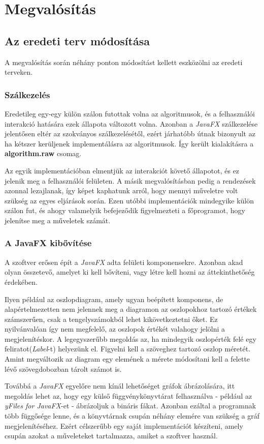 \documentclass{elteikthesis}
\begin{document}
\section{Megvalósítás}
\subsection{Az eredeti terv módosítása}
A megvalósítás során néhány ponton módosítást kellett eszközölni az eredeti terveken.
\subsubsection{Szálkezelés}
Eredetileg egy-egy külön szálon futottak volna az algoritmusok, és a felhasználói interakció hatására ezek állapota változott volna. Azonban a \emph{JavaFX} szálkezelése jelentősen eltér az szokványos szálkezelésétől, ezért járhatóbb útnak bizonyult az ha kétszer kerüljenek implementálásra az algoritmusok. Így került kialakításra a \textbf{algorithm.raw} csomag.\par
 Az egyik implementációban elmentjük az interakciót követő állapotot, és ez jelenik meg a felhasználói felületen. A másik megvalósításban pedig a rendezések azonnal lezajlanak, így képet kaphatunk arról, hogy mennyi műveletre volt szükség az egyes eljárások során. Ezen utóbbi implementációk mindegyike külön szálon fut, és ahogy valamelyik befejeződik figyelmezteti a főprogramot, hogy jelenítse meg a műveletek számát.
\subsubsection{A JavaFX kibővítése}
A szoftver erősen épít a \emph{JavaFX} adta felületi komponensekre. Azonban akad olyan összetevő, amelyet ki kell bővíteni, vagy létre kell hozni az áttekinthetőség érdekében.\par
Ilyen például az oszlopdiagram, amely ugyan beépített komponens, de alapértelmezetten nem jelennek meg a diagramon az oszlopokhoz tartozó értékek számszerűen, csak a tengelyszámokból lehet kikövetkeztetni őket. Ez nyilvánvalóan így nem megfelelő, az oszlopok értékét valahogy jelölni a megjelenítéskor. A legegyszerűbb megoldás az, ha mindegyik oszlopérték felé egy feliratot(\emph{Label}-t) helyezünk el. Figyelni kell a szöveghez tartozó oszlop méretét. Amint megváltozik az diagram egy elemének a mérete módosítani kell a felette lévő szövegdobozban tárolt számot is.\par
Továbbá a \emph{JavaFX} egyelőre nem kínál lehetőséget gráfok ábrázolására, itt megoldás lehet az, hogy egy külső függvénykönyvtárat felhasználva - például az \emph{yFiles for JavaFX}-et -  ábrázoljuk a bináris fákat. Azonban ezáltal a programnak több függősége lenne, és a könyvtárnak csupán néhány elemére van szükség a gráf megjelenítéséhez. Ezért célszerűbb egy saját implementációt készíteni, amely csupán azokat a műveleteket tartalmazza, amiket a szoftver használ.
\end{document}
